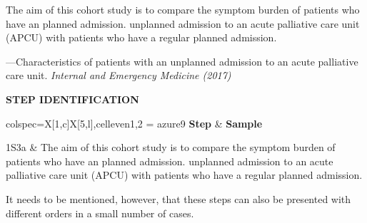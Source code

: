 \documentclass{ctexbook}
\begin{document}
\begin{sample}[label={myautocounter}]{\heiti}

  The aim of this cohort study is to compare the symptom burden of patients who have an planned admission. unplanned admission to an acute palliative care unit (APCU) with patients who have a regular planned admission.

  
  \begin{flushright}
    ---Characteristics of patients with an unplanned admission to an acute palliative care unit. \emph{Internal and Emergency Medicine (2017)}
  \end{flushright}

  \tcblower

  \noindent \textbf{STEP IDENTIFICATION}

  \vspace*{10pt}
  {\small\noindent
  \begin{tblr}{colspec={X[1,c]X[5,l]},cell{even}{1,2} = {azure9}}
    \toprule
    \textbf{Step} & \textbf{Sample} \\ 
    \midrule
    
    1S3a & The aim of this cohort study is to compare the symptom burden of patients who have an planned admission. unplanned admission to an acute palliative care unit (APCU) with patients who have a regular planned admission. \\
      
    \bottomrule
  \end{tblr}
  }

\end{sample}

It needs to be mentioned, however, that these steps can also be presented with different orders in a small number of cases.
\end{document}
